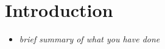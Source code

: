 \section{Introduction}
\begin{itemize}
    \item \textit{brief  summary of what you have done}
\end{itemize}